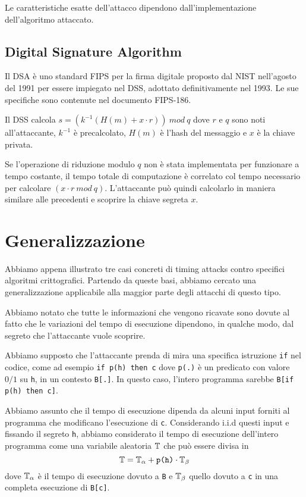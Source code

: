 		Le caratteristiche esatte dell'attacco dipendono dall'implementazione dell'algoritmo attaccato.
		
		\subsection{Digital Signature Algorithm}
		Il \ac{DSA} è uno standard \ac{FIPS} per la firma digitale proposto dal \ac{NIST} nell'agosto del 1991 per essere impiegato nel \ac{DSS}, adottato definitivamente nel 1993. Le sue specifiche sono contenute nel documento \ac{FIPS}-186\cite{kravitz1993digital}.
		
		Il \ac{DSS} calcola $s = (k^{-1}(H(m) + x \cdot r)) \ mod \ q$ dove $r$ e $q$ sono noti all'attaccante, $k^{-1}$ è precalcolato, $H(m)$ è l'hash del messaggio e $x$ è la chiave privata.
		
		Se l'operazione di riduzione modulo $q$ non è stata implementata per funzionare a tempo costante, il tempo totale di computazione è correlato col tempo necessario per calcolare $(x \cdot r \ mod \ q)$. L'attaccante può quindi calcolarlo in maniera similare alle precedenti e scoprire la chiave segreta $x$.
		
	\section{Generalizzazione}
	Abbiamo appena illustrato tre casi concreti di timing attacks contro specifici algoritmi crittografici. Partendo da queste basi, abbiamo cercato una generalizzazione applicabile alla maggior parte degli attacchi di questo tipo.
	
	Abbiamo notato che tutte le informazioni che vengono ricavate sono dovute al fatto che le variazioni del tempo di esecuzione dipendono, in qualche modo, dal segreto che l'attaccante vuole scoprire.
	
	Abbiamo supposto che l'attaccante prenda di mira una specifica istruzione \texttt{if} nel codice, come ad esempio \texttt{if p(h) then c} dove \texttt{p(.)} è un predicato con valore $0/1$ su \texttt{h}, in un contesto \texttt{B[.]}. In questo caso, l'intero programma sarebbe \texttt{B[if p(h) then c]}.
	
	Abbiamo assunto che il tempo di esecuzione dipenda da alcuni input forniti al programma che modificano l'esecuzione di \texttt{c}. Considerando i.i.d questi input e fissando il segreto \texttt{h}, abbiamo considerato il tempo di esecuzione dell'intero programma come una variabile aleatoria $\mathbb{T}$ che può essere divisa in \begin{equation} \label{eq:1}
		\mathbb{T} = \mathbb{T}_{\alpha} + \text{\texttt{p(h)}}\cdot \mathbb{T}_{\beta}
	\end{equation} 
	dove $\mathbb{T}_{\alpha}$ è il tempo di esecuzione dovuto a \texttt{B} e $\mathbb{T}_{\beta}$ quello dovuto a \texttt{c} in una completa esecuzione di \texttt{B[c]}.
	
